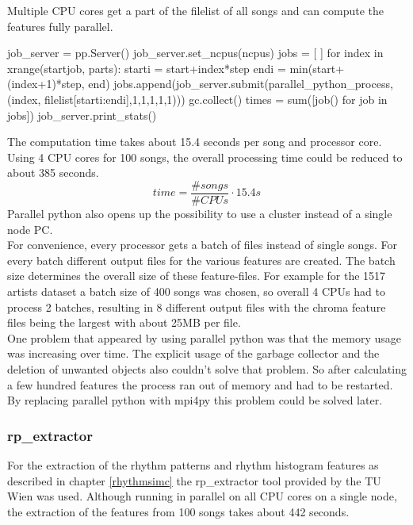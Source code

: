 Multiple CPU cores get a part of the filelist of all songs and can compute the features fully parallel.
\newpage
\begin{pythonCode}[frame=single,label={lst:pp},caption={parallel python},captionpos=b]
job_server = pp.Server()
job_server.set_ncpus(ncpus)
jobs = [ ]
for index in xrange(startjob, parts):
	starti = start+index*step
	endi = min(start+(index+1)*step, end)
	jobs.append(job_server.submit(parallel_python_process, (index, 
		filelist[starti:endi],1,1,1,1,1)))
	gc.collect()
times = sum([job() for job in jobs])
job_server.print_stats()
\end{pythonCode}
The computation time takes about 15.4 seconds per song and processor core. Using 4 CPU cores for 100 songs, the overall processing time could be reduced to about 385 seconds. 
\begin{equation} \label{eq:parallelp}
time = \frac{\#songs}{\#CPUs} \cdot 15.4s
\end{equation}
Parallel python also opens up the possibility to use a cluster instead of a single node PC.\\
For convenience, every processor gets a batch of files instead of single songs. For every batch different output files for the various features are created. The batch size determines the overall size of these feature-files. For example for the 1517 artists dataset a batch size of 400 songs was chosen, so overall 4 CPUs had to process 2 batches, resulting in 8 different output files with the chroma feature files being the largest with about 25MB per file.\\
One problem that appeared by using parallel python was that the memory usage was increasing over time. The explicit usage of the garbage collector and the deletion of unwanted objects also couldn't solve that problem. So after calculating a few hundred features the process ran out of memory and had to be restarted. By replacing parallel python with mpi4py this problem could be solved later. 

\subsubsection{rp\_extractor}

For the extraction of the rhythm patterns and rhythm histogram features as described in chapter \ref{rhythmsimc} the rp\_extractor tool provided by the TU Wien was used. Although running in parallel on all CPU cores on a single node, the extraction of the features from 100 songs takes about 442 seconds.


